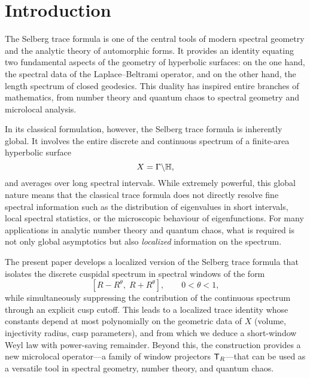 \section{Introduction}\label{sec:intro}

The Selberg trace formula is one of the central tools of modern spectral geometry and the analytic theory of automorphic forms. It provides an identity equating two fundamental aspects of the geometry of hyperbolic surfaces: on the one hand, the spectral data of the Laplace--Beltrami operator, and on the other hand, the length spectrum of closed geodesics. This duality has inspired entire branches of mathematics, from number theory and quantum chaos to spectral geometry and microlocal analysis.

In its classical formulation, however, the Selberg trace formula is inherently global. It involves the entire discrete and continuous spectrum of a finite-area hyperbolic surface
\[
  X = \Gamma \backslash \mathbb{H},
\]
and averages over long spectral intervals. While extremely powerful, this global nature means that the classical trace formula does not directly resolve fine spectral information such as the distribution of eigenvalues in short intervals, local spectral statistics, or the microscopic behaviour of eigenfunctions. For many applications in analytic number theory and quantum chaos, what is required is not only global asymptotics but also \emph{localized} information on the spectrum.

The present paper develops a localized version of the Selberg trace formula that isolates the discrete cuspidal spectrum in spectral windows of the form
\[
  [R - R^\theta,\; R + R^\theta], \qquad 0 < \theta < 1,
\]
while simultaneously suppressing the contribution of the continuous spectrum through an explicit cusp cutoff. This leads to a localized trace identity whose constants depend at most polynomially on the geometric data of $X$ (volume, injectivity radius, cusp parameters), and from which we deduce a short-window Weyl law with power-saving remainder. Beyond this, the construction provides a new microlocal operator---a family of window projectors $\mathsf{T}_R$---that can be used as a versatile tool in spectral geometry, number theory, and quantum chaos.

